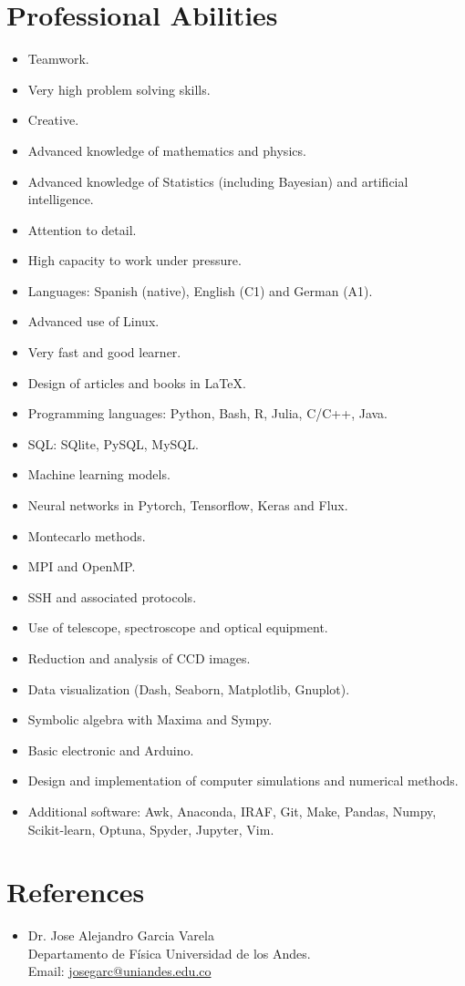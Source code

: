 \documentclass[11pt, a4paper]{article}
\begin{document}
{{\section*{Professional Abilities}
\begin{itemize}
\item Teamwork.
\item Very high problem solving skills.
\item Creative.
\item Advanced knowledge of mathematics and physics.
\item Advanced knowledge of Statistics (including Bayesian) and artificial intelligence.
\item Attention to detail.
\item High capacity to work under pressure.
\item Languages: Spanish (native), English (C1) and German (A1).
\item Advanced use of Linux.
\item Very fast and good learner.
\item Design of articles and books in \LaTeX.
\item Programming languages: Python, Bash, R, Julia, C/C++, Java.
\item SQL: SQlite, PySQL, MySQL.
\item Machine learning models.
\item Neural networks in Pytorch, Tensorflow, Keras and Flux. 
\item Montecarlo methods.
\item MPI and OpenMP.
\item SSH and associated protocols.
\item Use of telescope, spectroscope and optical equipment.
\item Reduction and analysis of CCD images.
\item Data visualization (Dash, Seaborn, Matplotlib, Gnuplot).
\item Symbolic algebra with Maxima and Sympy.
\item Basic electronic and Arduino.
\item Design and implementation of computer simulations and numerical methods.
\item Additional software: Awk, Anaconda, IRAF, Git, Make, Pandas, Numpy, Scikit-learn, Optuna, Spyder, Jupyter, Vim.
\end{itemize}

\section*{References}
\begin{itemize}
\item Dr. Jose Alejandro Garcia Varela\\
Departamento de Física Universidad de los Andes.\\
Email: \href{mailto:josegarc@uniandes.edu.co}{josegarc@uniandes.edu.co}


\end{itemize}}}
\end{document}
